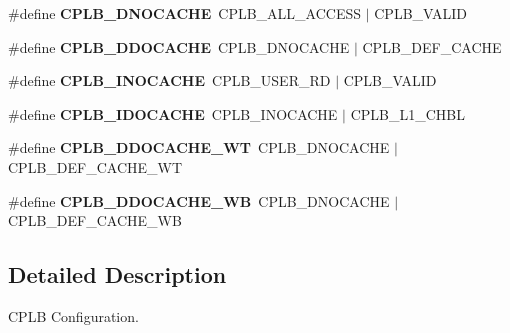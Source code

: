 \begin{DoxyCompactItemize}
\item 
\mbox{\label{group__tll6527m__cplb_ga72f24546dea2abff828ee2fa096a2a74}} 
\#define {\bfseries C\+P\+L\+B\+\_\+\+D\+N\+O\+C\+A\+C\+HE}~C\+P\+L\+B\+\_\+\+A\+L\+L\+\_\+\+A\+C\+C\+E\+SS $\vert$ C\+P\+L\+B\+\_\+\+V\+A\+L\+ID
\item 
\mbox{\label{group__tll6527m__cplb_ga1f2412705be4a4b8ca6b9cf1385934dd}} 
\#define {\bfseries C\+P\+L\+B\+\_\+\+D\+D\+O\+C\+A\+C\+HE}~C\+P\+L\+B\+\_\+\+D\+N\+O\+C\+A\+C\+HE $\vert$ C\+P\+L\+B\+\_\+\+D\+E\+F\+\_\+\+C\+A\+C\+HE
\item 
\mbox{\label{group__tll6527m__cplb_ga934f17af51c07482d66f7a02be0d3610}} 
\#define {\bfseries C\+P\+L\+B\+\_\+\+I\+N\+O\+C\+A\+C\+HE}~C\+P\+L\+B\+\_\+\+U\+S\+E\+R\+\_\+\+RD $\vert$ C\+P\+L\+B\+\_\+\+V\+A\+L\+ID
\item 
\mbox{\label{group__tll6527m__cplb_gab07d1b3d9324197d3e6bb29927b7b288}} 
\#define {\bfseries C\+P\+L\+B\+\_\+\+I\+D\+O\+C\+A\+C\+HE}~C\+P\+L\+B\+\_\+\+I\+N\+O\+C\+A\+C\+HE $\vert$ C\+P\+L\+B\+\_\+\+L1\+\_\+\+C\+H\+BL
\item 
\mbox{\label{group__tll6527m__cplb_ga0a8f090006ba9b886bfc032b65de2053}} 
\#define {\bfseries C\+P\+L\+B\+\_\+\+D\+D\+O\+C\+A\+C\+H\+E\+\_\+\+WT}~C\+P\+L\+B\+\_\+\+D\+N\+O\+C\+A\+C\+HE $\vert$ C\+P\+L\+B\+\_\+\+D\+E\+F\+\_\+\+C\+A\+C\+H\+E\+\_\+\+WT
\item 
\mbox{\label{group__tll6527m__cplb_gad2e788259927d6094b4b48c865593a65}} 
\#define {\bfseries C\+P\+L\+B\+\_\+\+D\+D\+O\+C\+A\+C\+H\+E\+\_\+\+WB}~C\+P\+L\+B\+\_\+\+D\+N\+O\+C\+A\+C\+HE $\vert$ C\+P\+L\+B\+\_\+\+D\+E\+F\+\_\+\+C\+A\+C\+H\+E\+\_\+\+WB
\end{DoxyCompactItemize}


\subsection{Detailed Description}
C\+P\+LB Configuration. 

